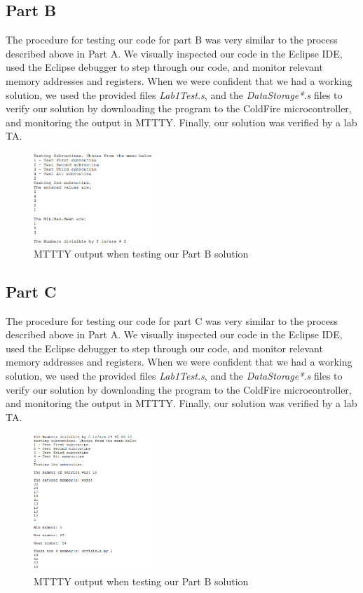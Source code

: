 \documentclass[letterpaper]{article}
\begin{document}
  \subsection{Part B}
    The procedure for testing our code for part B was very similar to the process
    described above in Part A. We visually inspected our code in the Eclipse IDE,
    used the Eclipse debugger to step through our code, and monitor relevant
    memory addresses and registers. When we were confident that we had a working
    solution, we used the provided files \textit{Lab1Test.s}, and the \textit{DataStorage*.s}
    files to verify our solution by downloading the program to the ColdFire microcontroller,
    and monitoring the output in MTTTY. Finally, our solution was verified by a lab TA.

    \begin{figure}[H]
      \centering
      \includegraphics[width=0.4\textwidth]{partb.jpg}
      \caption{MTTTY output when testing our Part B solution}
    \end{figure}

    \subsection{Part C}
      The procedure for testing our code for part C was very similar to the process
      described above in Part A. We visually inspected our code in the Eclipse IDE,
      used the Eclipse debugger to step through our code, and monitor relevant
      memory addresses and registers. When we were confident that we had a working
      solution, we used the provided files \textit{Lab1Test.s}, and the \textit{DataStorage*.s}
      files to verify our solution by downloading the program to the ColdFire microcontroller,
      and monitoring the output in MTTTY. Finally, our solution was verified by a lab TA.

      \begin{figure}[H]
        \centering
        \includegraphics[width=0.4\textwidth]{partc.jpg}
        \caption{MTTTY output when testing our Part B solution}
      \end{figure}
\end{document}
